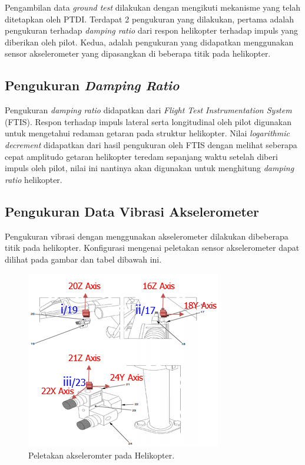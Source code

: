 Pengambilan data \textit{ground test} dilakukan dengan mengikuti mekanisme yang telah ditetapkan oleh PTDI. Terdapat 2 pengukuran yang dilakukan, pertama adalah pengukuran terhadap \textit{damping ratio} dari respon helikopter terhadap impuls yang diberikan oleh pilot. Kedua, adalah pengukuran yang didapatkan menggunakan sensor akselerometer yang dipasangkan di beberapa titik pada helikopter.

\subsection{Pengukuran \textit{Damping Ratio}}
Pengukuran \textit{damping ratio} didapatkan dari \textit{Flight Test Instrumentation System} (FTIS). Respon terhadap impuls lateral serta longitudinal oleh pilot digunakan untuk mengetahui redaman getaran pada struktur helikopter. Nilai \textit{logarithmic decrement} didapatkan dari hasil pengukuran oleh FTIS dengan melihat seberapa cepat amplitudo getaran helikopter teredam sepanjang waktu setelah diberi impuls oleh pilot, nilai ini nantinya akan digunakan untuk menghitung \textit{damping ratio} helikopter.

\subsection{Pengukuran Data Vibrasi Akselerometer}
Pengukuran vibrasi dengan menggunakan akselerometer dilakukan dibeberapa titik pada helikopter. Konfigurasi mengenai peletakan sensor akselerometer dapat dilihat pada gambar dan tabel dibawah ini.

\begin{figure}[H]
	\centering
	\includegraphics[width=0.5\linewidth]{gambar/peletakan_sensor.png}
	\caption{Peletakan akseleromter pada Helikopter.}
	\label{peletakan_sensor.png}
\end{figure}

